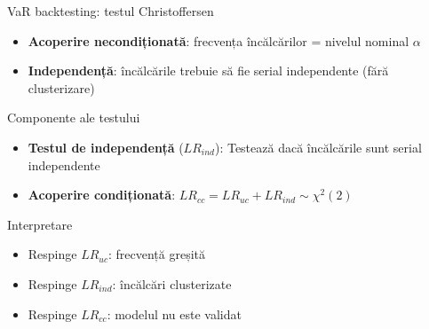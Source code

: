 \documentclass[9pt, aspectratio=169, t]{beamer}
\begin{document}
\begin{frame}{VaR backtesting: testul Christoffersen}
    \small
        \vspace{-0.3cm}
        \begin{prop}
            \begin{itemize}
                \item \textbf{Acoperire necondiționată}: frecvența încălcărilor = nivelul nominal $\alpha$
                \item \textbf{Independență}: încălcările trebuie să fie serial independente (fără clusterizare)
            \end{itemize}
        \end{prop}
        \vspace{-0.1cm}
        \begin{block}{Componente ale testului}
            \begin{itemize}
                \item \textbf{Testul de independență} ($LR_{ind}$): Testează dacă încălcările sunt serial independente
                \item \textbf{Acoperire condiționată}: $LR_{cc} = LR_{uc} + LR_{ind} \sim \chi^2(2)$
            \end{itemize}
        \end{block}
        \vspace{-0.1cm}
        \begin{alertblock}{Interpretare}
            \begin{itemize}
                \item Respinge $LR_{uc}$: frecvență greșită
                \item Respinge $LR_{ind}$: încălcări clusterizate
                \item Respinge $LR_{cc}$: modelul nu este validat
            \end{itemize}
        \end{alertblock}
\end{frame}
\end{document}

